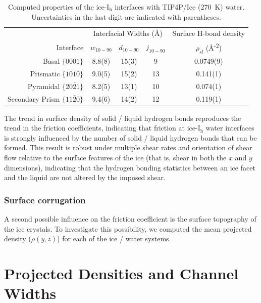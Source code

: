 \begin{table}[h]
\centering
\caption{Computed properties of the
  ice-I$_\mathrm{h}$ interfaces with TIP4P/Ice (270~K) water. Uncertainties in the last digit are indicated with
  parentheses. \label{tab:propsTIP4P}}
\begin{tabular}{r|ccc|c}  
  \toprule
  & \multicolumn{3}{c|}{Interfacial Widths (\AA)} & 
                                                    Surface H-bond
                                                    density \\
  Interface & $w_\mathrm{10-90}$ &  $d_\mathrm{10-90}$ & $j_\mathrm{10-90}$ & $\rho_{sl}$ (\AA\textsuperscript{-2}) \\ 
  \midrule
  Basal  $\{0001\}$                 & 8.8(8) & 15(3) & 9   & 0.0749(9)\\
  Prismatic  $\{10\bar{1}0\}$       & 9.0(5) & 15(2) & 13  & 0.141(1) \\
  Pyramidal  $\{20\bar{2}1\}$       & 8.2(5) & 13(1) & 10  & 0.074(1) \\
  Secondary Prism  $\{11\bar{2}0\}$ & 9.4(6) & 14(2)   & 12  & 0.119(1) \\
  \bottomrule
\end{tabular}
\end{table}

The trend in surface density of solid / liquid hydrogen bonds
reproduces the trend in the friction coefficients, indicating that
friction at ice-I$_\mathrm{h}$ water interfaces is strongly influenced
by the number of solid / liquid hydrogen bonds that can be formed.
This result is robust under multiple shear rates and orientation of
shear flow relative to the surface features of the ice (that is, shear
in both the $x$ and $y$ dimensions), indicating that the hydrogen
bonding statistics between an ice facet and the liquid are not altered
by the imposed shear.

\subsubsection{Surface corrugation}
A second possible influence on the friction coefficient is the surface
topography of the ice crystals. To investigate this possibility, we
computed the mean projected density ($\rho(y,z)$) for each of the
ice / water systems.
\section{Projected Densities and Channel Widths}

